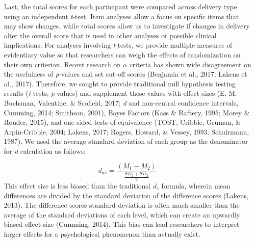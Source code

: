 \documentclass[english,man, mask]{apa6}
\theoremstyle{definition}
\theoremstyle{definition}
\theoremstyle{definition}
\theoremstyle{remark}
\begin{document}
Last, the total scores for each participant were compared across
delivery type using an independent \emph{t}-test. Item analyses allow a
focus on specific items that may show changes, while total scores allow
us to investigate if changes in delivery alter the overall score that is
used in other analyses or possible clinical implications. For analyses
involving \emph{t}-tests, we provide multiple measures of evidentiary
value so that researchers can weigh the effects of randomization on
their own criterion. Recent research on \(\alpha\) criteria has shown
wide disagreement on the usefulness of \emph{p}-values and set cut-off
scores (Benjamin et al., 2017; Lakens et al., 2017). Therefore, we
sought to provide traditional null hypothesis testing results
(\emph{t}-tests, \emph{p}-values) and supplement these values with
effect sizes (E. M. Buchanan, Valentine, \& Scofield, 2017; \emph{d} and
non-central confidence intervals, Cumming, 2014; Smithson, 2001), Bayes
Factors (Kass \& Raftery, 1995; Morey \& Rouder, 2015), and one-sided
tests of equivalence (TOST, Cribbie, Gruman, \& Arpin-Cribbie, 2004;
Lakens, 2017; Rogers, Howard, \& Vessey, 1993; Schuirmann, 1987). We
used the average standard deviation of each group as the denominator for
\emph{d} calculation as follows:

\[
d_{av} = \frac {(M_1 -  M_2) } { \frac{SD_1 + SD_2 } {2} }
\] This effect size is less biased than the traditional \(d_z\) formula,
wherein mean differences are divided by the standard deviation of the
difference scores (Lakens, 2013). The difference scores standard
deviation is often much smaller than the average of the standard
deviations of each level, which can create an upwardly biased effect
size (Cumming, 2014). This bias can lead researchers to interpret larger
effects for a psychological phenomenon than actually exist.
\end{document}
